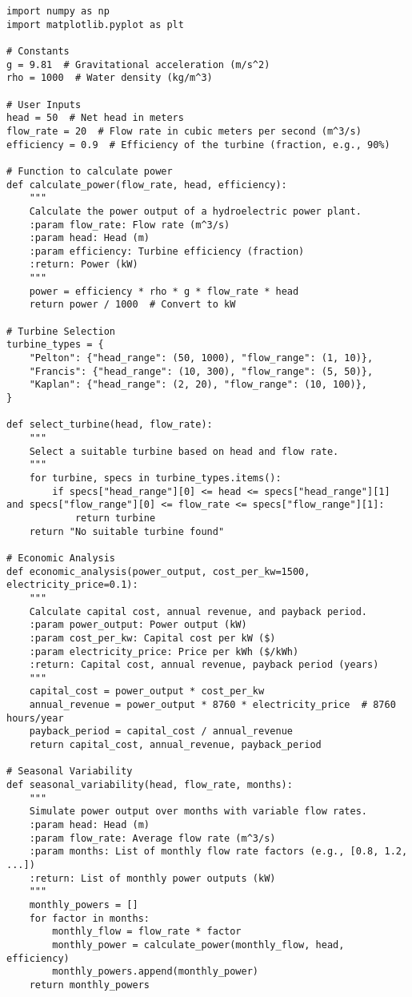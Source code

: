 \documentclass[11pt]{article}
\begin{document}
\begin{lstlisting}[style=custompython, caption=Python Code for Design of a Hydro Power Plant]
    import numpy as np
import matplotlib.pyplot as plt

# Constants
g = 9.81  # Gravitational acceleration (m/s^2)
rho = 1000  # Water density (kg/m^3)

# User Inputs
head = 50  # Net head in meters
flow_rate = 20  # Flow rate in cubic meters per second (m^3/s)
efficiency = 0.9  # Efficiency of the turbine (fraction, e.g., 90%)

# Function to calculate power
def calculate_power(flow_rate, head, efficiency):
    """
    Calculate the power output of a hydroelectric power plant.
    :param flow_rate: Flow rate (m^3/s)
    :param head: Head (m)
    :param efficiency: Turbine efficiency (fraction)
    :return: Power (kW)
    """
    power = efficiency * rho * g * flow_rate * head
    return power / 1000  # Convert to kW

# Turbine Selection
turbine_types = {
    "Pelton": {"head_range": (50, 1000), "flow_range": (1, 10)},
    "Francis": {"head_range": (10, 300), "flow_range": (5, 50)},
    "Kaplan": {"head_range": (2, 20), "flow_range": (10, 100)},
}

def select_turbine(head, flow_rate):
    """
    Select a suitable turbine based on head and flow rate.
    """
    for turbine, specs in turbine_types.items():
        if specs["head_range"][0] <= head <= specs["head_range"][1] and specs["flow_range"][0] <= flow_rate <= specs["flow_range"][1]:
            return turbine
    return "No suitable turbine found"

# Economic Analysis
def economic_analysis(power_output, cost_per_kw=1500, electricity_price=0.1):
    """
    Calculate capital cost, annual revenue, and payback period.
    :param power_output: Power output (kW)
    :param cost_per_kw: Capital cost per kW ($)
    :param electricity_price: Price per kWh ($/kWh)
    :return: Capital cost, annual revenue, payback period (years)
    """
    capital_cost = power_output * cost_per_kw
    annual_revenue = power_output * 8760 * electricity_price  # 8760 hours/year
    payback_period = capital_cost / annual_revenue
    return capital_cost, annual_revenue, payback_period

# Seasonal Variability
def seasonal_variability(head, flow_rate, months):
    """
    Simulate power output over months with variable flow rates.
    :param head: Head (m)
    :param flow_rate: Average flow rate (m^3/s)
    :param months: List of monthly flow rate factors (e.g., [0.8, 1.2, ...])
    :return: List of monthly power outputs (kW)
    """
    monthly_powers = []
    for factor in months:
        monthly_flow = flow_rate * factor
        monthly_power = calculate_power(monthly_flow, head, efficiency)
        monthly_powers.append(monthly_power)
    return monthly_powers


\end{lstlisting}
\end{document}
